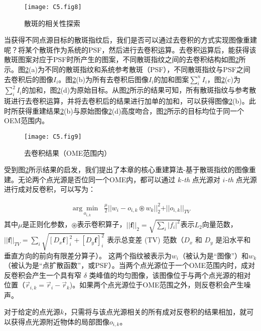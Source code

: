 \begin{figure}[htp]
	\centering
	\texttt{[image: C5.fig8]}
	\caption{散斑的相关性探索}
	\label{fig:5.8}
\end{figure}

当获得不同点源目标的散斑指纹后，我们是否可以通过去卷积的方式实现图像重建呢？将某个散斑作为系统的PSF，然后进行去卷积运算\cite{biggs_acceleration_1997}。去卷积运算后，能获得该散斑图案对应于PSF时所产生的图案，不同散斑指纹之间的去卷积结构如图\ref{fig:5.9}所示。图\ref{fig:5.9}(a)为不同的散斑指纹和系统参考散斑（PSF），不同散斑指纹与PSF之间去卷积后的图像$I_{i}$。图\ref{fig:5.9}(b)为所有去卷积后图像$I_{i}$的加和图案$\sum_{i}^{n} I_{i}$，图\ref{fig:5.9}(c)为$\sum_{i}^{2} I_{i}$的加和，图\ref{fig:5.9}(d)为原始目标。从图\ref{fig:5.9}所示的结果可知，所有散斑指纹与参考散斑进行去卷积运算，并将去卷积后的结果进行加单的加和，可以获得图像\ref{fig:5.9}(b)。此时所获得重建结果\ref{fig:5.9}(b)与原始图像\ref{fig:5.9}(d)高度吻合，图\ref{fig:5.9}所示的目标均位于同一个OEM范围内。

\begin{figure}[htp]
	\centering
	\texttt{[image: C5.fig9]}
	\caption{去卷积结果（OME范围内）}
	\label{fig:5.9}
\end{figure}

受到图\ref{fig:5.9}所示结果的启发，我们提出了本章的核心重建算法-基于散斑指纹的图像重建。无论两个点光源是否位同一个OME内，都可以通过 $k$\textsl{-th} 点光源对 $i$\textsl{-th} 点光源进行成对反卷积，可以写为：

\begin{equation}
	\begin{aligned}
\underset{o_{i,k}}{\arg\min \;\;}
\frac{\mu}{2} \vert\vert w_{i}-o_{i,k}\circledast w_{k}\vert\vert^2_{2}+\vert\vert o_{i,k}\vert\vert_{TV}
\label{eq:5.4}
\end{aligned}
\end{equation}
其中$\mu$是正则化参数，$\circledast$表示卷积算子，$\vert\vert \mathbf{f}\vert\vert_2 = \sqrt{\sum_{i} \vert f_i\vert^2} $表示$L_{2}$向量范数，
$\vert\vert \mathbf{f} \vert\vert_{TV} = \sum_{i}\sqrt{[D_x\mathbf{f}]_i^2 +[D_y\mathbf{f}]_i^2}$ 表示总变差 (TV) 范数（$D_x$ 和 $D_y$ 是沿水平和垂直方向的前向有限差分算子）。
这两个指纹被表示为$w_{i}$（被认为是“图像”）和$w_{k}$（被认为是“点扩散函数”，或PSF）。当两个点光源位于一个OME范围内时，成对反卷积会产生一个具有窄 $\delta$ 类峰值的均匀图像，该图像位于与两个点光源的相对位置（$\vec{r} _{i,k} = \vec{r}_i - \vec{r}_k$)。如果两个点光源位于OME范围之外，则反卷积会产生噪声。

对于给定的点光源$k$，只需将与该点光源相关的所有成对反卷积的结果相加，就可以获得点光源附近物体的局部图像$o_{i,k}$。

